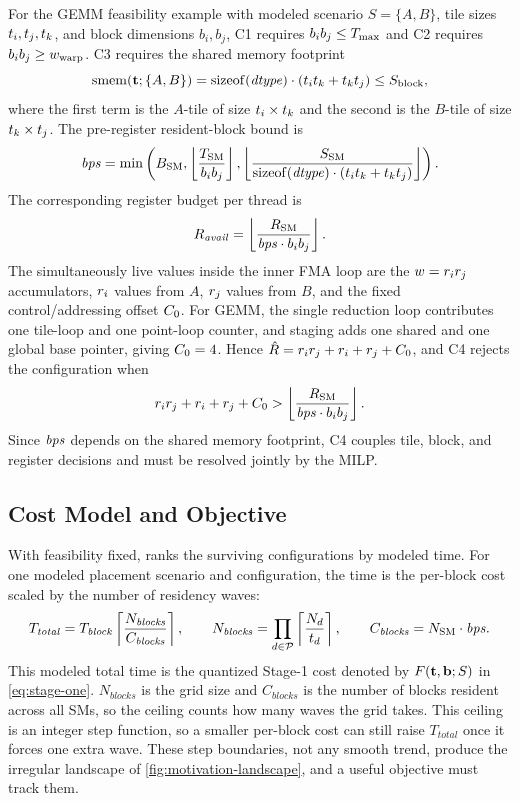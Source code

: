 For the GEMM feasibility example with modeled scenario \(S=\{A,B\}\), tile sizes
\(t_i,t_j,t_k\), and
block dimensions \(b_i,b_j\), C1 requires \(b_i b_j\le T_{\max}\) and C2
requires \(b_i b_j\ge w_{\mathrm{warp}}\). C3 requires the shared memory footprint
\[
\operatorname{smem}(\mathbf{t};\{A,B\}) =
\operatorname{sizeof}(\mathit{dtype})\cdot(t_it_k+t_kt_j)
\le S_{\mathrm{block}},
\]
where the first term is the \(A\)-tile of size \(t_i\times t_k\) and the
second is the \(B\)-tile of size \(t_k\times t_j\). The pre-register
resident-block bound is
\[
\mathit{bps}=\min\left(B_{\mathrm{SM}},
\left\lfloor \frac{T_{\mathrm{SM}}}{b_i b_j}\right\rfloor,
\left\lfloor
\frac{S_{\mathrm{SM}}}
{\operatorname{sizeof}(\mathit{dtype})\cdot(t_it_k+t_kt_j)}
\right\rfloor\right).
\]
The corresponding register budget per thread is
\[
R_{\mathit{avail}}=\left\lfloor
\frac{R_{\mathrm{SM}}}{\mathit{bps}\cdot b_i b_j}\right\rfloor.
\]
The simultaneously live values inside the inner FMA loop are the \(w=r_ir_j\) accumulators, \(r_i\) values from \(A\), \(r_j\) values from \(B\), and the fixed control/addressing offset \(C_0\). For GEMM, the single reduction loop contributes one tile-loop and one point-loop counter, and staging adds one shared and one global base pointer, giving \(C_0=4\). Hence \(\hat{R}=r_ir_j+r_i+r_j+C_0\), and C4 rejects the configuration when
\[
r_ir_j+r_i+r_j+C_0 >
\left\lfloor \frac{R_{\mathrm{SM}}}{\mathit{bps}\cdot b_i b_j}\right\rfloor.
\]
Since \(\mathit{bps}\) depends on the shared memory footprint, C4 couples tile, block, and register decisions and must be resolved jointly by the MILP.

\subsection{Cost Model and Objective}
\label{sec:cost}
\label{sec:outer-product-optimality}
\label{sec:kernel-specialization}

With feasibility fixed, \name ranks the surviving configurations by modeled time. For one modeled placement scenario and configuration, the time is the per-block cost scaled by the number of residency waves:
\begin{equation}
T_{\mathit{total}}
=T_{\mathit{block}}
 \left\lceil\frac{N_{\mathit{blocks}}}{C_{\mathit{blocks}}}\right\rceil,
\qquad
N_{\mathit{blocks}}
=\prod_{d\in\mathcal{P}}\left\lceil\frac{N_d}{t_d}\right\rceil,
\qquad C_{\mathit{blocks}}=N_{\mathrm{SM}}\cdot \mathit{bps}.
\label{eq:discrete-wave}
\end{equation}
This modeled total time is the quantized Stage-1 cost denoted by \(F(\mathbf{t},\mathbf{b};S)\) in \autoref{eq:stage-one}.
\(N_{\mathit{blocks}}\) is the grid size and \(C_{\mathit{blocks}}\) is the number of blocks resident across all SMs, so the ceiling counts how many waves the grid takes. This ceiling is an integer step function, so a smaller per-block cost can still raise \(T_{\mathit{total}}\) once it forces one extra wave. These step boundaries, not any smooth trend, produce the irregular landscape of \autoref{fig:motivation-landscape}, and a useful objective must track them.


